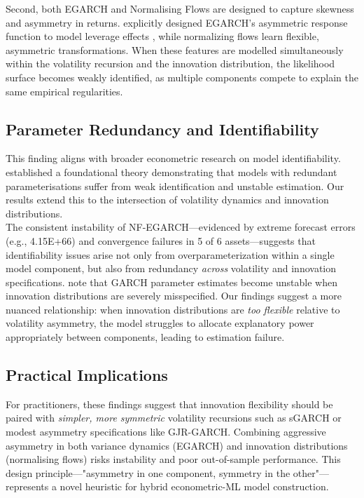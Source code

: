 \documentclass[oneside,12pt]{CUEDthesisPSnPDF}
\newcommand{\textcite}{\citet}
\newcommand{\parencite}{\citep}
\begin{document}
Second, both EGARCH and Normalising Flows are designed to capture skewness and asymmetry in returns. \textcite{nelson1991conditional} explicitly designed EGARCH's asymmetric response function to model leverage effects \parencite{black1976studies, campbell1992no}, while normalizing flows learn flexible, asymmetric transformations. When these features are modelled simultaneously within the volatility recursion and the innovation distribution, the likelihood surface becomes weakly identified, as multiple components compete to explain the same empirical regularities.\\

\subsection{Parameter Redundancy and Identifiability}
\noindent
This finding aligns with broader econometric research on model identifiability. \textcite{rothenberg1971identification} established a foundational theory demonstrating that models with redundant parameterisations suffer from weak identification and unstable estimation. Our results extend this to the intersection of volatility dynamics and innovation distributions.\\

The consistent instability of NF-EGARCH—evidenced by extreme forecast errors (e.g., 4.15E+66) and convergence failures in 5 of 6 assets—suggests that identifiability issues arise not only from overparameterization within a single model component, but also from redundancy \emph{across} volatility and innovation specifications. \textcite{francq2010garch} note that GARCH parameter estimates become unstable when innovation distributions are severely misspecified. Our findings suggest a more nuanced relationship: when innovation distributions are \emph{too flexible} relative to volatility asymmetry, the model struggles to allocate explanatory power appropriately between components, leading to estimation failure.\\

\subsection{Practical Implications}
\noindent
For practitioners, these findings suggest that innovation flexibility should be paired with \emph{simpler, more symmetric} volatility recursions such as sGARCH or modest asymmetry specifications like GJR-GARCH. Combining aggressive asymmetry in both variance dynamics (EGARCH) and innovation distributions (normalising flows) risks instability and poor out-of-sample performance. This design principle—"asymmetry in one component, symmetry in the other"—represents a novel heuristic for hybrid econometric-ML model construction.\\
\end{document}
